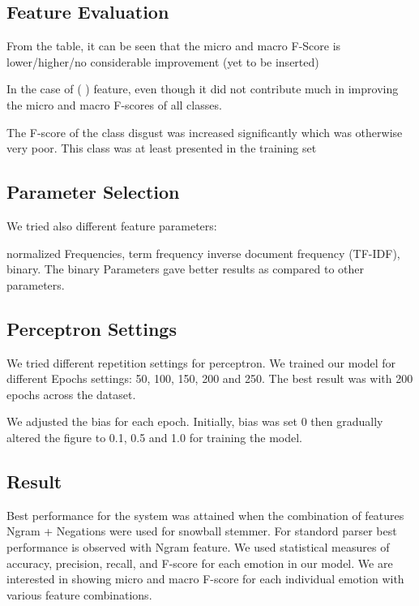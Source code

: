 \documentclass[11pt]{article}
\begin{document}
  \subsection{Feature Evaluation}
  
  From the table, it can be seen that the micro and macro F-Score is lower/higher/no considerable improvement (yet to be inserted)
  
  
  In the case of ( ) feature, even though it did not contribute much in improving the micro and macro F-scores of all classes.
  
  
  The F-score of the class disgust was increased significantly which was otherwise very poor. This class was at least presented in the training set
  
  \subsection{Parameter Selection}
  
  
  We tried also different feature parameters:
  
  
  normalized Frequencies, term frequency inverse document frequency (TF-IDF), binary. The binary Parameters gave better results as compared to other
  parameters.
  
  
  \subsection{Perceptron Settings}
  We tried different repetition settings for perceptron. We trained our model for different Epochs settings:
  50, 100, 150, 200 and 250. The best result was with 200 epochs across the dataset.
  
  We adjusted the bias for each epoch. Initially, bias was set 0 then gradually altered the figure to 0.1, 0.5 and 1.0 for training the model.
  
  \subsection{Result}
  
  Best performance for the system was attained when the combination of features Ngram + Negations were used for snowball stemmer.
  For standord parser best performance is observed with Ngram feature. We used statistical measures of accuracy, precision, recall, and F-score for each emotion in our model. We are interested in showing micro and macro F-score for each individual emotion with  various feature combinations.
  
\end{document}
